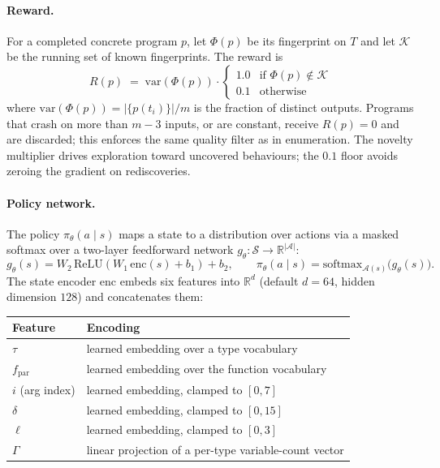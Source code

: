 \documentclass[12pt]{article}
\begin{document}
\paragraph{Reward.} For a completed concrete program $p$, let $\Phi(p)$ be its fingerprint on $T$ and let $\mathcal{K}$ be the running set of known fingerprints. The reward is
\[
  R(p) \;=\; \mathrm{var}(\Phi(p)) \cdot
    \begin{cases}
      1.0 & \text{if } \Phi(p) \notin \mathcal{K} \\
      0.1 & \text{otherwise}
    \end{cases}
\]
where $\mathrm{var}(\Phi(p)) = |\{p(t_i)\}| / m$ is the fraction of distinct outputs. Programs that crash on more than $m - 3$ inputs, or are constant, receive $R(p) = 0$ and are discarded; this enforces the same quality filter as in enumeration. The novelty multiplier drives exploration toward uncovered behaviours; the $0.1$ floor avoids zeroing the gradient on rediscoveries.

\paragraph{Policy network.} The policy $\pi_\theta(a \mid s)$ maps a state to a distribution over actions via a masked softmax over a two-layer feedforward network $g_\theta : \mathcal{S} \to \mathbb{R}^{|\mathcal{A}|}$:
\[
  g_\theta(s) = W_2\, \mathrm{ReLU}(W_1\, \mathrm{enc}(s) + b_1) + b_2,
  \qquad
  \pi_\theta(a \mid s) = \mathrm{softmax}_{\mathcal{A}(s)}\bigl(g_\theta(s)\bigr).
\]
The state encoder $\mathrm{enc}$ embeds six features into $\mathbb{R}^d$ (default $d = 64$, hidden dimension $128$) and concatenates them:

\begin{center}
\begin{tabular}{ll}
\toprule
Feature & Encoding \\
\midrule
$\tau$              & learned embedding over a type vocabulary \\
$f_{\text{par}}$    & learned embedding over the function vocabulary \\
$i$ (arg index)     & learned embedding, clamped to $[0,7]$ \\
$\delta$            & learned embedding, clamped to $[0,15]$ \\
$\ell$              & learned embedding, clamped to $[0,3]$ \\
$\Gamma$            & linear projection of a per-type variable-count vector \\
\bottomrule
\end{tabular}
\end{center}
\end{document}
